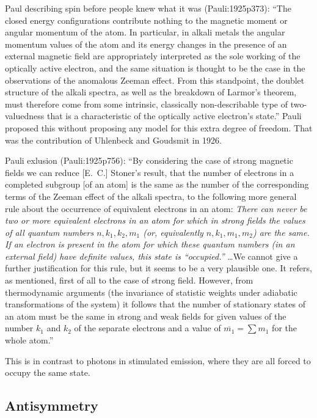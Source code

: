 Paul describing spin before people knew what it was (Pauli:1925p373):
``The closed energy configurations contribute nothing to the magnetic moment or
angular momentum of the atom.
In particular, in alkali metals the angular momentum values of the atom and its
energy changes in the presence of an external magnetic field are appropriately
interpreted as the sole working of the optically active electron, and the same
situation is thought to be the case in the observations of the anomalous Zeeman
effect.
From this standpoint, the doublet structure of the alkali spectra, as well as
the breakdown of Larmor's theorem, must therefore come from some intrinsic,
classically non-describable type of two-valuedness that is a characteristic of
the optically active electron's state.''
Pauli proposed this without proposing any model for this extra degree of
freedom.
That was the contribution of Uhlenbeck and Goudsmit in 1926.


Pauli exlusion (Pauli:1925p756):
``By considering the case of strong magnetic fields we can reduce [E.~C.]
Stoner's result, that the number of electrons in a completed subgroup [of an
atom] is the same as the number of the corresponding terms of the Zeeman effect
of the alkali spectra, to the following more general rule about the occurrence
of equivalent electrons in an atom:
{\itshape
    There can never be two or more equivalent electrons in an atom for which in
    strong fields the values of all quantum numbers \(n, k_1, k_2, m_1\) (or,
    equivalently \(n, k_1, m_1, m_2\)) are  the same.
    If an electron is present in the atom for which these quantum numbers (in an
    external field) have definite values, this state is ``occupied.''%
}
\dots We cannot give a further justification for this rule, but it seems to be a
very plausible one.
It refers, as mentioned, first of all to the case of strong field.
However, from thermodynamic arguments (the invariance of statistic weights under
adiabatic transformations of the system) it follows that the number of
stationary states of an atom must be the same in strong and weak fields for
given values of the number \(k_1\) and \(k_2\) of the separate electrons and a
value of \(\overline{m_1}=\sum m_1\) for the whole atom.''

This is in contrast to photons in stimulated emission, where they are all forced
to occupy the same state.

\subsection{Antisymmetry}

